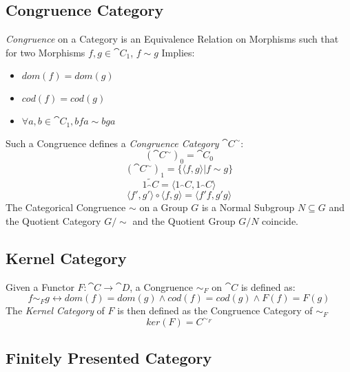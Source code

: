 \subsection{Congruence Category}\label{sec:congruence_category}

\emph{Congruence} on a Category is an Equivalence Relation on
Morphisms such that for two Morphisms $f,g \in \cat{C_1}$, $f \sim
g$ Implies:
\begin{itemize}
  \item $dom(f) = dom(g)$
  \item $cod(f) = cod(g)$
  \item $\forall a,b \in \cat{C_1}, bfa \sim bga$
\end{itemize}
Such a Congruence defines a \emph{Congruence Category}
$\cat{C^{\sim}}$:
\[
  (\cat{C^{\sim}})_0 = \cat{C}_0
\]\[
  (\cat{C^{\sim}})_1 = \{\langle f,g \rangle | f \sim g\}
\]\[
  \tilde{1_\cat{C}} = \langle 1_\cat{C}, 1_\cat{C} \rangle
\]\[
  \langle f',g' \rangle \circ \langle f,g \rangle = \langle f'f,g'g \rangle
\]
The Categorical Congruence $\sim$ on a Group $G$ is a Normal Subgroup
$N \subseteq G$ and the Quotient Category $G/\sim$ and the Quotient
Group $G/N$ coincide. \cite{awodey06}



\subsection{Kernel Category}\label{sec:kernel_category}

Given a Functor $F : \cat{C} \rightarrow \cat{D}$, a Congruence
$\sim_F$ on $\cat{C}$ is defined as:
\[
  f \sim_F g \leftrightarrow dom(f) = dom(g) \wedge cod(f) = cod(g)
  \wedge F(f) = F(g)
\]
The \emph{Kernel Category} of $F$ is then defined as the Congruence
Category of $\sim_F$
\[
  ker(F) = C^{\sim_F}
\]



\subsection{Finitely Presented Category}
\label{sec:finitely_presented}


